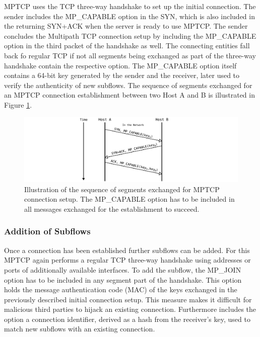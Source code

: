 MPTCP uses the TCP three-way handshake to set up the initial connection. The sender includes the MP\_CAPABLE option in the SYN, which is also included in the returning SYN+ACK when the server is ready to use MPTCP. The sender concludes the Multipath TCP connection setup by including the MP\_CAPABLE option in the third packet of the handshake as well. The connecting entities fall back fo regular TCP if not all segments being exchanged as part of the three-way handshake contain the respective option. The MP\_CAPABLE option itself contains a 64-bit key generated by the sender and the receiver, later used to verify the authenticity of new subflows. The sequence of segments exchanged for an MPTCP connection establishment between two Host A and B is illustrated in Figure \ref{fig:MTCPConnectionEstablishment}.

\begin{figure}[H]
	\begin{center} 
		\def\svgwidth{1\textwidth}
		\includegraphics[scale=0.24]{../illustrations/importantConcepts/MPTCPHandshake.pdf} 
		\caption[Caption for the list of figures.]{Illustration of the sequence of segments exchanged for MPTCP connection setup. The MP\_CAPABLE option has to be included in all messages exchanged for the establishment to succeed.}
		\label{fig:MTCPConnectionEstablishment}
	\end{center}
\end{figure}

\subsubsection{Addition of Subflows}

Once a connection has been established further subflows can be added. For this MPTCP again performs a regular TCP three-way handshake using addresses or ports of additionally available interfaces. To add the subflow, the MP\_JOIN option has to be included in any segment part of the handshake. This option holds the message authentication code (MAC) of the keys exchanged in the previously described initial connection setup. This measure makes it difficult for malicious third parties to hijack an existing connection. Furthermore includes the option a connection identifier, derived as a hash from the receiver's key, used to match new subflows with an existing connection. 


